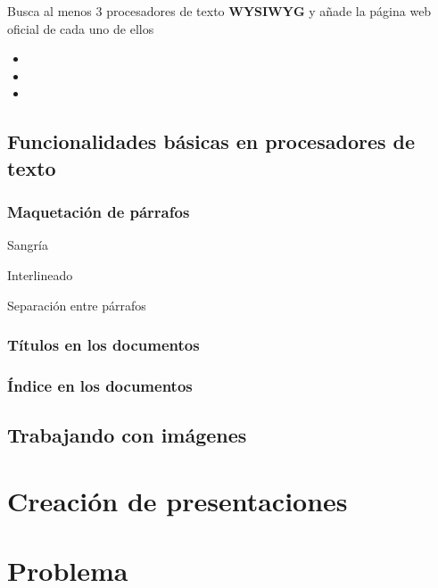 \begin{tcolorbox}[title=Ejercicio,]
    Busca al menos 3 procesadores de texto \textbf{WYSIWYG} y añade la página web oficial de cada uno de ellos
    \tcblower
    \begin{itemize}
        \item
        \item
        \item
    \end{itemize}
\end{tcolorbox}


\section{Funcionalidades básicas en procesadores de texto}

\subsection{Maquetación de párrafos}

Sangría

Interlineado

Separación entre párrafos


\subsection{Títulos en los documentos}

\subsection{Índice en los documentos}


\section{Trabajando con imágenes}


\chapter{Creación de presentaciones}



\chapter{Problema}
